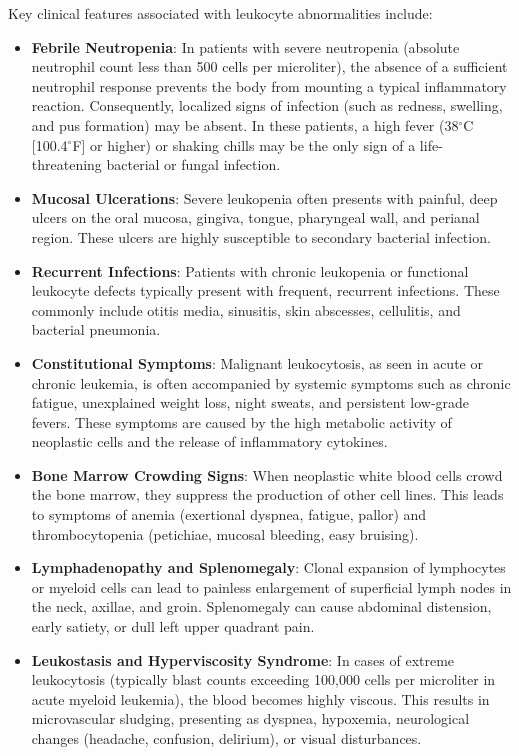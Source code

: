 Key clinical features associated with leukocyte abnormalities include:
\begin{itemize}
  \item \textbf{Febrile Neutropenia}: In patients with severe neutropenia (absolute neutrophil count less than 500 cells per microliter), the absence of a sufficient neutrophil response prevents the body from mounting a typical inflammatory reaction. Consequently, localized signs of infection (such as redness, swelling, and pus formation) may be absent. In these patients, a high fever (38$^\circ$C [100.4$^\circ$F] or higher) or shaking chills may be the only sign of a life-threatening bacterial or fungal infection.
  \item \textbf{Mucosal Ulcerations}: Severe leukopenia often presents with painful, deep ulcers on the oral mucosa, gingiva, tongue, pharyngeal wall, and perianal region. These ulcers are highly susceptible to secondary bacterial infection.
  \item \textbf{Recurrent Infections}: Patients with chronic leukopenia or functional leukocyte defects typically present with frequent, recurrent infections. These commonly include otitis media, sinusitis, skin abscesses, cellulitis, and bacterial pneumonia.
  \item \textbf{Constitutional Symptoms}: Malignant leukocytosis, as seen in acute or chronic leukemia, is often accompanied by systemic symptoms such as chronic fatigue, unexplained weight loss, night sweats, and persistent low-grade fevers. These symptoms are caused by the high metabolic activity of neoplastic cells and the release of inflammatory cytokines.
  \item \textbf{Bone Marrow Crowding Signs}: When neoplastic white blood cells crowd the bone marrow, they suppress the production of other cell lines. This leads to symptoms of anemia (exertional dyspnea, fatigue, pallor) and thrombocytopenia (petichiae, mucosal bleeding, easy bruising).
  \item \textbf{Lymphadenopathy and Splenomegaly}: Clonal expansion of lymphocytes or myeloid cells can lead to painless enlargement of superficial lymph nodes in the neck, axillae, and groin. Splenomegaly can cause abdominal distension, early satiety, or dull left upper quadrant pain.
  \item \textbf{Leukostasis and Hyperviscosity Syndrome}: In cases of extreme leukocytosis (typically blast counts exceeding 100,000 cells per microliter in acute myeloid leukemia), the blood becomes highly viscous. This results in microvascular sludging, presenting as dyspnea, hypoxemia, neurological changes (headache, confusion, delirium), or visual disturbances.
\end{itemize}

